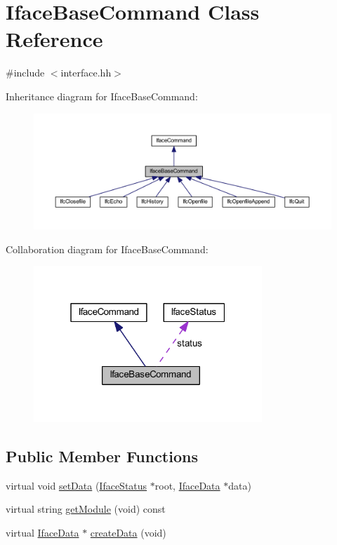 \hypertarget{class_iface_base_command}{}\section{Iface\+Base\+Command Class Reference}
\label{class_iface_base_command}


{\ttfamily \#include $<$interface.\+hh$>$}



Inheritance diagram for Iface\+Base\+Command\+:
\nopagebreak
\begin{figure}[H]
\begin{center}
\leavevmode
\includegraphics[width=350pt]{class_iface_base_command__inherit__graph}
\end{center}
\end{figure}


Collaboration diagram for Iface\+Base\+Command\+:
\nopagebreak
\begin{figure}[H]
\begin{center}
\leavevmode
\includegraphics[width=244pt]{class_iface_base_command__coll__graph}
\end{center}
\end{figure}
\subsection*{Public Member Functions}
\begin{DoxyCompactItemize}
\item 
virtual void \mbox{\hyperlink{class_iface_base_command_a551f7828c74ff2c0324ed4b3c0210039}{set\+Data}} (\mbox{\hyperlink{class_iface_status}{Iface\+Status}} $\ast$root, \mbox{\hyperlink{class_iface_data}{Iface\+Data}} $\ast$data)
\item 
virtual string \mbox{\hyperlink{class_iface_base_command_add0c9e33b2e1a56b04caab6aaea343dd}{get\+Module}} (void) const
\item 
virtual \mbox{\hyperlink{class_iface_data}{Iface\+Data}} $\ast$ \mbox{\hyperlink{class_iface_base_command_aa9084b1ec06e7bd05b88a89303fd42a4}{create\+Data}} (void)
\end{DoxyCompactItemize}
